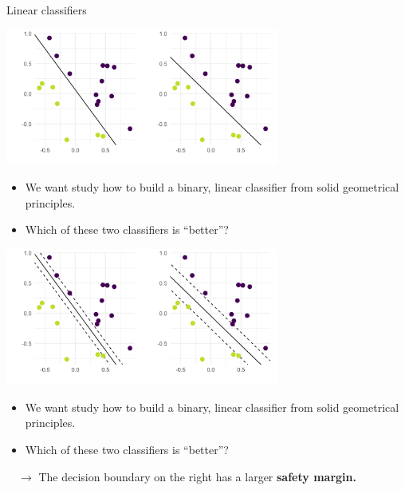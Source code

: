\begin{vbframe}{Linear classifiers}


\begin{center}
\includegraphics[width =9cm]{figure/linear_classif_1.png} \\
\end{center}


\vspace{-0.5em}

\begin{itemize}
    \item We want study how to build a binary, linear classifier 
      from solid geometrical principles.  
    \item Which of these two classifiers is \enquote{better}?
\end{itemize}
  
  \framebreak
  

\begin{center}
\includegraphics[width =9cm]{figure/linear_classif_2.png} \\
\end{center}


\vspace{-0.5em}

\begin{itemize}
    \item We want study how to build a binary, linear classifier 
      from solid geometrical principles.  
    \item Which of these two classifiers is \enquote{better}?
\end{itemize}
  
    $\quad \rightarrow$ The decision boundary on the right has a larger \textbf{safety margin.}


\end{vbframe}


